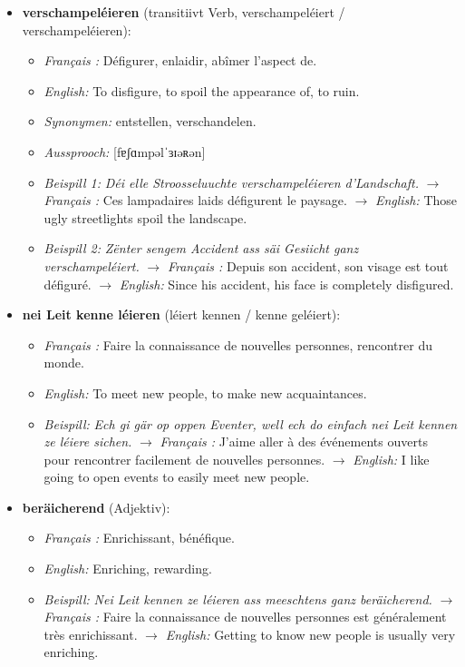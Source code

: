 \begin{itemize}
    \vspace{0.6em}

    \item \textbf{verschampeléieren} (transitiivt Verb, verschampeléiert / verschampeléieren):
    \begin{itemize}
        \item \textit{Français :} Défigurer, enlaidir, abîmer l'aspect de.
        \item \textit{English:} To disfigure, to spoil the appearance of, to ruin.
        \item \textit{Synonymen:} entstellen, verschandelen.
        \item \textit{Aussprooch:} [fɐʃɑmpəlˈɜɪəʀən]
        \item \textit{Beispill 1:} \textit{Déi elle Stroosseluuchte verschampeléieren d'Landschaft.}
        $\rightarrow$ \textit{Français :} Ces lampadaires laids défigurent le paysage.
        $\rightarrow$ \textit{English:} Those ugly streetlights spoil the landscape.
        \item \textit{Beispill 2:} \textit{Zënter sengem Accident ass säi Gesiicht ganz verschampeléiert.}
        $\rightarrow$ \textit{Français :} Depuis son accident, son visage est tout défiguré.
        $\rightarrow$ \textit{English:} Since his accident, his face is completely disfigured.
    \end{itemize}

    \item \textbf{nei Leit kenne léieren} (léiert kennen / kenne geléiert):
    \begin{itemize}
        \item \textit{Français :} Faire la connaissance de nouvelles personnes, rencontrer du monde.
        \item \textit{English:} To meet new people, to make new acquaintances.
        \item \textit{Beispill:} \textit{Ech gi gär op oppen Eventer, well ech do einfach nei Leit kennen ze léiere sichen.}
        $\rightarrow$ \textit{Français :} J'aime aller à des événements ouverts pour rencontrer facilement de nouvelles personnes.
        $\rightarrow$ \textit{English:} I like going to open events to easily meet new people.
    \end{itemize}

    \vspace{0.6em}

    \item \textbf{beräicherend} (Adjektiv):
    \begin{itemize}
        \item \textit{Français :} Enrichissant, bénéfique.
        \item \textit{English:} Enriching, rewarding.
        \item \textit{Beispill:} \textit{Nei Leit kennen ze léieren ass meeschtens ganz beräicherend.}
        $\rightarrow$ \textit{Français :} Faire la connaissance de nouvelles personnes est généralement très enrichissant.
        $\rightarrow$ \textit{English:} Getting to know new people is usually very enriching.
    \end{itemize}


\end{itemize}
